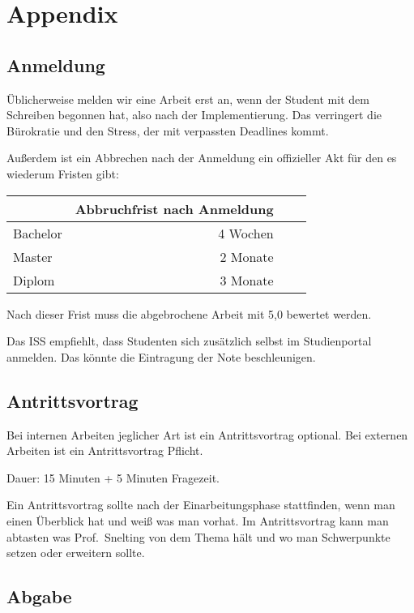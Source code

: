 \chapter{Appendix}

\section{Anmeldung}

Üblicherweise melden wir eine Arbeit erst an,
wenn der Student mit dem Schreiben begonnen hat,
also nach der Implementierung.
Das verringert die Bürokratie und den Stress,
der mit verpassten Deadlines kommt.

Außerdem ist ein Abbrechen nach der Anmeldung ein offizieller Akt
für den es wiederum Fristen gibt:

\begin{center}
\begin{tabular}{lrrr}
\toprule
 & Abbruchfrist nach Anmeldung \\
\midrule
Bachelor      & 4 Wochen \\
Master        & 2 Monate \\
Diplom        & 3 Monate \\
\bottomrule
\end{tabular}
\end{center}

Nach dieser Frist muss die abgebrochene Arbeit mit 5,0 bewertet werden.

Das ISS empfiehlt, dass Studenten sich zusätzlich selbst im Studienportal anmelden.
Das könnte die Eintragung der Note beschleunigen.

\section{Antrittsvortrag}

Bei internen Arbeiten jeglicher Art ist ein Antrittsvortrag optional.
Bei externen Arbeiten ist ein Antrittsvortrag Pflicht.

Dauer: 15 Minuten + 5 Minuten Fragezeit.

Ein Antrittsvortrag sollte nach der Einarbeitungsphase stattfinden,
wenn man einen Überblick hat und weiß was man vorhat.
Im Antrittsvortrag kann man abtasten was Prof.~Snelting von dem Thema hält
und wo man Schwerpunkte setzen oder erweitern sollte.

\section{Abgabe}

